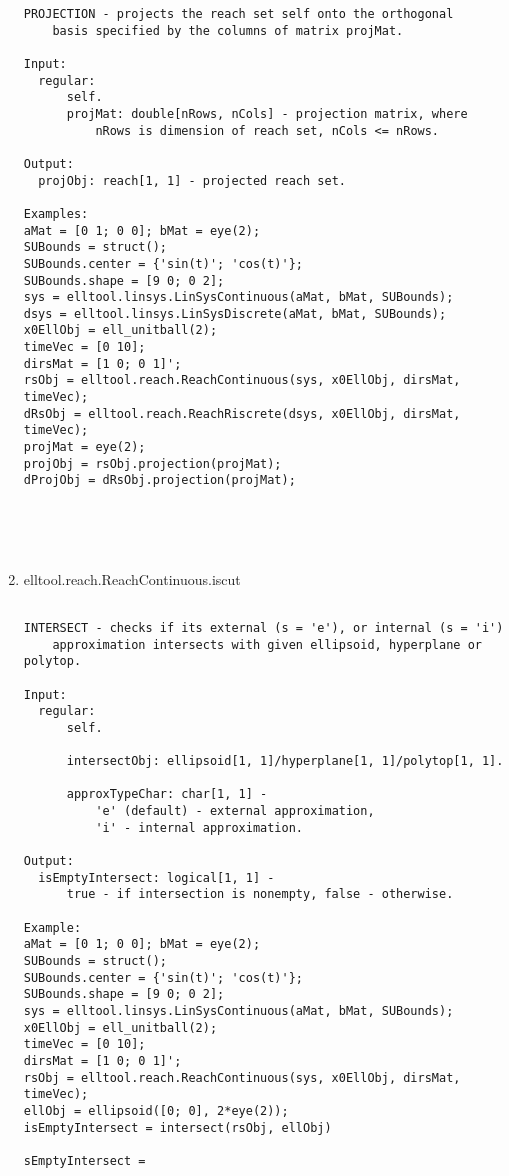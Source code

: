 \begin{enumerate}
\begin{lstlisting}
PROJECTION - projects the reach set self onto the orthogonal
    basis specified by the columns of matrix projMat.

Input:
  regular:
      self.
      projMat: double[nRows, nCols] - projection matrix, where
          nRows is dimension of reach set, nCols <= nRows.

Output:
  projObj: reach[1, 1] - projected reach set.

Examples:
aMat = [0 1; 0 0]; bMat = eye(2);
SUBounds = struct();
SUBounds.center = {'sin(t)'; 'cos(t)'};
SUBounds.shape = [9 0; 0 2];
sys = elltool.linsys.LinSysContinuous(aMat, bMat, SUBounds);
dsys = elltool.linsys.LinSysDiscrete(aMat, bMat, SUBounds);
x0EllObj = ell_unitball(2);
timeVec = [0 10];
dirsMat = [1 0; 0 1]';
rsObj = elltool.reach.ReachContinuous(sys, x0EllObj, dirsMat, timeVec);
dRsObj = elltool.reach.ReachRiscrete(dsys, x0EllObj, dirsMat, timeVec);
projMat = eye(2);
projObj = rsObj.projection(projMat);
dProjObj = dRsObj.projection(projMat);





\end{lstlisting}
\fontfamily{\familydefault}
\selectfont
\item {elltool.reach.ReachContinuous.iscut}
\selectfont
\begin{lstlisting}

INTERSECT - checks if its external (s = 'e'), or internal (s = 'i')
    approximation intersects with given ellipsoid, hyperplane or polytop.

Input:
  regular:
      self.

      intersectObj: ellipsoid[1, 1]/hyperplane[1, 1]/polytop[1, 1].

      approxTypeChar: char[1, 1] -
          'e' (default) - external approximation,
          'i' - internal approximation.

Output:
  isEmptyIntersect: logical[1, 1] -
      true - if intersection is nonempty, false - otherwise.

Example:
aMat = [0 1; 0 0]; bMat = eye(2);
SUBounds = struct();
SUBounds.center = {'sin(t)'; 'cos(t)'};
SUBounds.shape = [9 0; 0 2];
sys = elltool.linsys.LinSysContinuous(aMat, bMat, SUBounds);
x0EllObj = ell_unitball(2);
timeVec = [0 10];
dirsMat = [1 0; 0 1]';
rsObj = elltool.reach.ReachContinuous(sys, x0EllObj, dirsMat, timeVec);
ellObj = ellipsoid([0; 0], 2*eye(2));
isEmptyIntersect = intersect(rsObj, ellObj)

sEmptyIntersect =


\end{lstlisting}
\end{enumerate}

